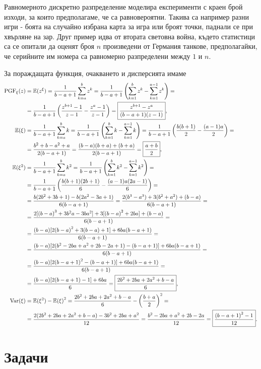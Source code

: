 \documentclass[numbers=endperiod, DIV=15, bibliography=totocnumbered]{scrartcl}
\begin{document}
Равномерното дискретно разпределение моделира експерименти с краен брой изходи, за които предполагаме, че са равновероятни. Такива са например разни игри - боята на случайно избрана карта за игра или броят точки, паднали се при хвърляне на зар. Друг пример идва от втората световна война, където статистици са се опитали да оценят броя $n$ произведени от Германия танкове, предполагайки, че серийните им номера са равномерно разпределени между $1$ и $n$.

За пораждащата функция, очакването и дисперсията имаме
\begingroup
\allowdisplaybreaks
\begin{align*}
  \operatorname{PGF}_\xi(z)
  &=
  \mathbb{E}(z^\xi)
  =
  \frac 1 {b-a+1} \sum_{k=a}^b z^k
  =
  \frac 1 {b-a+1} \left( \sum_{k=1}^b z^k - \sum_{k=1}^{a-1} z^k \right)
  = \\ &=
  \frac 1 {b-a+1} \left(\frac {z^{b+1} - 1} {z - 1} - \frac {z^a - 1} {z - 1} \right)
  =
  \boxed{\frac {z^{b+1} - z^a} {(b-a+1)(z-1)}},
  \\
  \mathbb{E}(\xi)
  &=
  \frac 1 {b-a+1} \sum_{k=a}^b k
  =
  \frac 1 {b-a+1} \left( \sum_{k=1}^b k - \sum_{k=1}^{a-1} k \right)
  =
  \frac 1 {b-a+1} \left( \frac {b(b+1)} 2 - \frac {(a-1)a} 2 \right)
  = \\ &=
  \frac {b^2 + b - a^2 + a} {2(b-a+1)}
  =
  \frac {(b-a)(b+a) + (b+a)} {2(b-a+1)}
  =
  \boxed{\frac {a+b} 2},
  \\
  \mathbb{E}(\xi^2)
  &=
  \frac 1 {b-a+1} \sum_{k=a}^b k^2
  =
  \frac 1 {b-a+1} \left( \sum_{k=1}^b k^2 - \sum_{k=1}^{a-1} k^2 \right)
  = \\ &=
  \frac 1 {b-a+1} \left( \frac {b(b+1)(2b+1)} 6 - \frac {(a-1)a(2a-1)} 6 \right)
  = \\ &=
  \frac {b(2b^2 + 3b + 1) - b(2a^2 - 3a + 1)} {6(b-a+1)}
  =
  \frac {2(b^3 - a^3) + 3(b^2 + a^2) + (b-a)} {6(b-a+1)}
  = \\ &=
  \frac {2[{(b-a)}^3 + 3b^2a - 3ba^2] + 3[{(b-a)}^2 + 2ba] + (b-a)} {6(b-a+1)}
  = \\ &=
  \frac {(b-a) [2{(b-a)}^2 + 3(b-a) + 1] + 6ba(b-a+1)} {6(b-a+1)}
  = \\ &=
  \frac {(b-a) [2(b^2 - 2ba + a^2 + 2b - 2a + 1) - (b-a+1)] + 6ba(b-a+1)} {6(b-a+1)}
  = \\ &=
  \frac {(b-a) [2{(b-a+1)}^2 - (b-a+1)] + 6ba(b-a+1)} {6(b-a+1)}
  = \\ &=
  \frac {(b-a) [2(b-a+1)-1] + 6ba} 6
  =
  \boxed{\frac {2b^2+2ba+2a^2+b-a} 6},
  \\
  \operatorname{Var}(\xi)
  &=
  \mathbb{E}(\xi^2) - {\mathbb{E}(\xi)}^2
  =
  \frac {2b^2+2ba+2a^2+b-a} 6 - {\left( \frac {b+a} 2 \right)}^2
  = \\ &=
  \frac {2(2b^2+2ba+2a^2+b-a) - 3{b^2+2ba+a^2}} {12}
  =
  \frac {b^2-2ba+a^2+2b-2a} {12}
  =
  \boxed{\frac {{(b-a+1)}^2-1} {12}}.
\end{align*}
\endgroup
\section{Задачи}

\printbibliography
\end{document}
